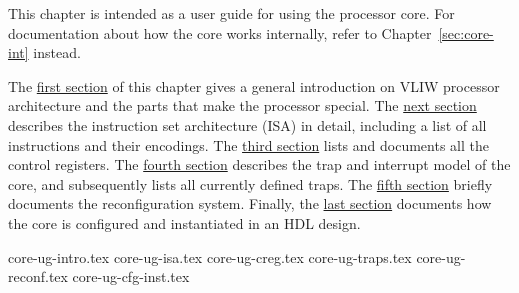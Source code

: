 \label{sec:core-ug}

This chapter is intended as a user guide for using the \rvex{} processor core.
For documentation about how the core works internally, refer to
Chapter~\ref{sec:core-int} instead.

The \hyperref[sec:core-ug-intro]{first section} of this chapter gives a general 
introduction on VLIW processor architecture and the parts that make the \rvex{} 
processor special. The \hyperref[sec:core-ug-isa]{next section} describes the 
instruction set architecture (ISA) in detail, including a list of all 
instructions and their encodings. The \hyperref[sec:core-ug-creg]{third section} 
lists and documents all the control registers. The 
\hyperref[sec:core-ug-traps]{fourth section} describes the trap and interrupt 
model of the core, and subsequently lists all currently defined traps. The 
\hyperref[sec:core-ug-reconf]{fifth section} briefly documents the 
reconfiguration system. Finally, the \hyperref[sec:core-ug-cfg-inst]{last 
section} documents how the core is configured and instantiated in an HDL design.

{core-ug-intro.tex}
{core-ug-isa.tex}
{core-ug-creg.tex}
{core-ug-traps.tex}
{core-ug-reconf.tex}
{core-ug-cfg-inst.tex}

